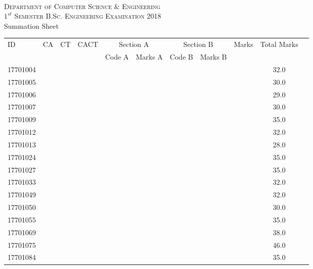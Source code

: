 \documentclass[12pt]{article}
\begin{document}
    \centering
    \begin{minipage}[m]{.8\textwidth} \centering 
	\smallskip
	\\
	\textsc{Department of Computer Science \& Engineering}\\
	\textsc{$1^{st}$ Semester B.Sc. Engineering Examination 2018}\\
	{\large {\sc Summation Sheet}}\\  
    \end{minipage} 
    \begin{center} 
	\renewcommand{\arraystretch}{1.08}
	\begin{small}
    \begin{tabular}{|l|c|c|c|c|c|c|c|c|c|c|} \hline
	\multirow{2}{*}{ID} & 	\multirow{2}{*}{CA}  & 	\multirow{2}{*}{CT}  & 	\multirow{2}{*}{CACT}  & \multicolumn{2 }{|c|}{Section A}& \multicolumn{2 }{c|}{Section B} & 	\multirow{2}{*}{Marks}  & 	\multirow{2}{*}{Total Marks}  \\ 
	&  &  &  & Code A & Marks A & Code B & Marks B&  &  \\ \hline
17701004 &  &  &  &  &  &  &  &  & 32.0\\ \hline 
17701005 &  &  &  &  &  &  &  &  & 30.0\\ \hline 
17701006 &  &  &  &  &  &  &  &  & 29.0\\ \hline 
17701007 &  &  &  &  &  &  &  &  & 30.0\\ \hline 
17701009 &  &  &  &  &  &  &  &  & 35.0\\ \hline 
17701012 &  &  &  &  &  &  &  &  & 32.0\\ \hline 
17701013 &  &  &  &  &  &  &  &  & 28.0\\ \hline 
17701024 &  &  &  &  &  &  &  &  & 35.0\\ \hline 
17701027 &  &  &  &  &  &  &  &  & 35.0\\ \hline 
17701033 &  &  &  &  &  &  &  &  & 32.0\\ \hline 
17701049 &  &  &  &  &  &  &  &  & 32.0\\ \hline 
17701050 &  &  &  &  &  &  &  &  & 30.0\\ \hline 
17701055 &  &  &  &  &  &  &  &  & 35.0\\ \hline 
17701069 &  &  &  &  &  &  &  &  & 38.0\\ \hline 
17701075 &  &  &  &  &  &  &  &  & 46.0\\ \hline 
17701084 &  &  &  &  &  &  &  &  & 35.0\\ \hline 

\end{tabular}
\end{small}
\end{center}
\end{document}
